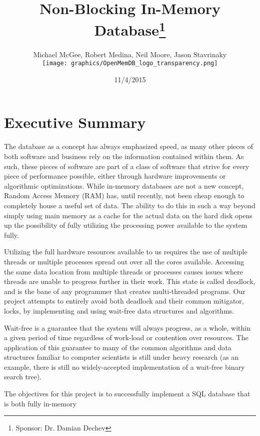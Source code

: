 \documentclass[letterpaper, 12pt]{article}
\title{Non-Blocking In-Memory Database\thanks{Sponsor: Dr. Damian Dechev}}
\author{Michael McGee, Robert Medina, Neil Moore, Jason Stavrinaky\\[2ex]
	\texttt{[image: graphics/OpenMemDB\_logo\_transparency.png]}\\[1ex]
}
\date{11/4/2015}
\begin{document}
\maketitle
\newpage

\tableofcontents
\newpage


\section{Executive Summary}
The database as a concept has always emphasized speed, as many other pieces of both software
and business rely on the information contained within them. As such, these pieces of software
are part of a class of software that strive for every piece of performance possible, either through
hardware improvements or algorithmic optimizations. While in-memory databases are not a new concept,
Random Access Memory (RAM) has, until recently, not been cheap enough to completely house a useful
set of data. The ability to do this in such a way beyond simply using main memory as a cache for the 
actual data on the hard disk opens up the possibility of fully utilizing the processing power
available to the system fully.
\par\vspace{\baselineskip}
Utilizing the full hardware resources available to us requires the use of multiple threads or 
multiple processes spread out over all the cores available. Accessing the same data location 
from multiple threads or processes causes issues where threads are unable to progress further in their
work. This state is called deadlock, and is the bane of any programmer that creates multi-threaded
programs. Our project attempts to entirely avoid both deadlock and their common mitigator, locks,
by implementing and using wait-free data structures and algorithms.
\par\vspace{\baselineskip}
Wait-free is a guarantee that the system will always progress, as a whole, within a given period of time
regardless of work-load or contention over resources. The application of this guarantee to many
of the common algorithms and data structures familiar to computer scientists is still under heavy research
(as an example, there is still no widely-accepted implementation of a wait-free binary search tree).
\par\vspace{\baselineskip}
The objectives for this project is to successfully implement a SQL database that is both fully in-memory
\end{document}
